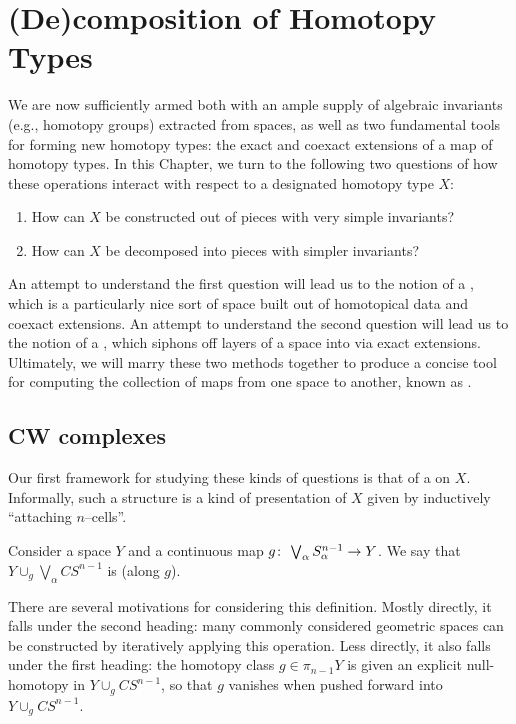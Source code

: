 
\chapter{(De)composition of Homotopy Types}

We are now sufficiently armed both with an ample supply of algebraic invariants (e.g., homotopy groups) extracted from spaces, as well as two fundamental tools for forming new homotopy types: the exact and coexact extensions of a map of homotopy types.
In this Chapter, we turn to the following two questions of how these operations interact with respect to a designated homotopy type $X$:
\begin{enumerate}
    \item How can $X$ be constructed out of pieces with very simple invariants?
    \item How can $X$ be decomposed into pieces with simpler invariants?
\end{enumerate}
An attempt to understand the first question will lead us to the notion of a , which is a particularly nice sort of space built out of homotopical data and coexact extensions.
An attempt to understand the second question will lead us to the notion of a , which siphons off layers of a space into  via exact extensions.
Ultimately, we will marry these two methods together to produce a concise tool for computing the collection of maps from one space to another, known as .




\section{CW complexes}

Our first framework for studying these kinds of questions is that of a  on $X$.
Informally, such a structure is a kind of presentation of $X$ given by inductively ``attaching $n$--cells''.

\begin{definition}
Consider a space $Y$ and a continuous map $g\colon\thinspace \bigvee_\alpha S^{n-1}_\alpha \to Y$.
We say that $Y \cup_g \bigvee_\alpha CS^{n-1}$ is  (along $g$).
\end{definition}

\noindent
There are several motivations for considering this definition.
Mostly directly, it falls under the second heading: many commonly considered geometric spaces can be constructed by iteratively applying this operation.
Less directly, it also falls under the first heading: the homotopy class $g \in \pi_{n-1} Y$ is given an explicit null-homotopy in $Y \cup_g CS^{n-1}$, so that $g$ vanishes when pushed forward into $Y \cup_g CS^{n-1}$.

